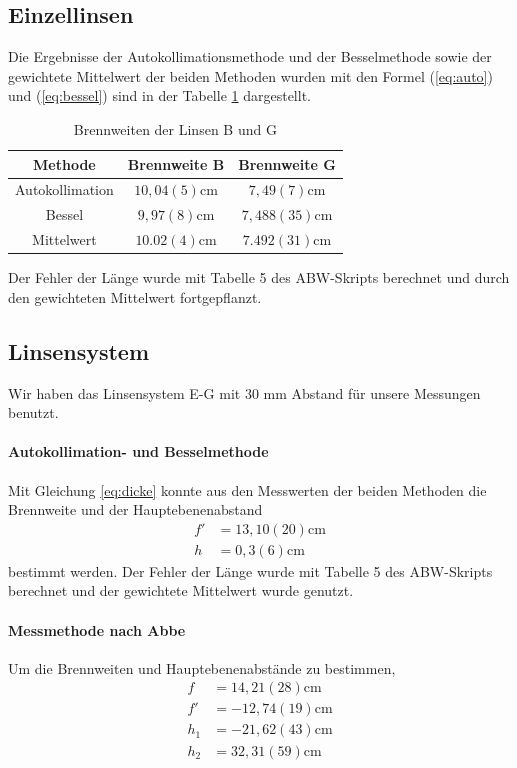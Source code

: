 \documentclass[11pt, a4paper]{article}
\begin{document}
    \subsection{Einzellinsen}
    Die Ergebnisse der Autokollimationsmethode und der Besselmethode sowie der gewichtete Mittelwert der beiden Methoden wurden mit den Formel (\ref{eq:auto}) und (\ref{eq:bessel}) sind in der Tabelle \ref{tab:ergebnisse} dargestellt.

    \begin{table}[h]
        \centering
        \begin{tabular}{c|c|c}
            Methode & Brennweite B & Brennweite G \\ \hline
            Autokollimation & $10,04(5) \si{\centi\metre}$ & $7,49(7) \si{\centi\metre}$ \\ \hline
            Bessel & $9,97(8) \si{\centi\metre}$ & $7,488(35) \si{\centi\metre}$ \\ \hline
            Mittelwert & $10.02(4) \si{\centi\metre}$ & $7.492(31) \si{\centi\metre}$
        \end{tabular}
        \caption{Brennweiten der Linsen B und G}
        \label{tab:ergebnisse}
    \end{table}
    Der Fehler der Länge wurde mit Tabelle 5 des ABW-Skripts \cite{ABW} berechnet und durch den gewichteten Mittelwert fortgepflanzt.

    \subsection{Linsensystem}
    Wir haben das Linsensystem E-G mit $30$ mm Abstand für unsere Messungen benutzt.

    \paragraph{Autokollimation- und Besselmethode}
    Mit Gleichung \ref{eq:dicke} konnte aus den Messwerten der beiden Methoden die Brennweite und der Hauptebenenabstand
    \begin{align}
        f' &= 13,10(20) \si{\centi\metre} \\
        h &= 0,3(6) \si{\centi\metre}
    \end{align}
    bestimmt werden. Der Fehler der Länge wurde mit Tabelle 5 des ABW-Skripts \cite{ABW} berechnet und der gewichtete Mittelwert wurde genutzt.

    \paragraph{Messmethode nach Abbe}
    Um die Brennweiten und Hauptebenenabstände zu bestimmen,
    \begin{align}
        f &= 14,21(28) \si{\centi\metre} \\
        f' &= -12,74(19) \si{\centi\metre} \\
        h_1 &= -21,62(43) \si{\centi\metre} \\
        h_2 &= 32,31(59) \si{\centi\metre}
    \end{align}
    
\end{document}

